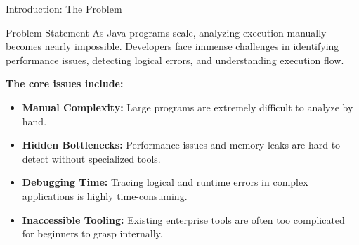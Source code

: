 \documentclass[aspectratio=169]{beamer}
\begin{document}
\begin{frame}{Introduction: The Problem}
    \begin{alertblock}{Problem Statement}
        As Java programs scale, analyzing execution manually becomes nearly impossible. Developers face immense challenges in identifying performance issues, detecting logical errors, and understanding execution flow.
    \end{alertblock}
    
    \vspace{0.3cm}
    \textbf{The core issues include:}
    \begin{itemize}
        \item \textbf{Manual Complexity:} Large programs are extremely difficult to analyze by hand.
        \item \textbf{Hidden Bottlenecks:} Performance issues and memory leaks are hard to detect without specialized tools.
        \item \textbf{Debugging Time:} Tracing logical and runtime errors in complex applications is highly time-consuming.
        \item \textbf{Inaccessible Tooling:} Existing enterprise tools are often too complicated for beginners to grasp internally.
    \end{itemize}
\end{frame}
\end{document}
